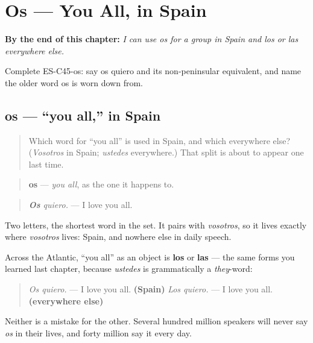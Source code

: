 
\chapter{Os --- You All, in Spain}
\label{ch:pronoun-os}

\begin{chapteropening}
\textbf{By the end of this chapter:} \emph{I can use os for a group in Spain and los or las everywhere else.}

Complete ES-C45-os: say os quiero and its non-peninsular equivalent, and name the older word os is worn down from.
\end{chapteropening}

\section[os]{os — \textquotedblleft{}you all,\textquotedblright{} in Spain}

\label{lesson:ES-C45-os}



\begin{quote}
Which word for \textquotedblleft{}you all\textquotedblright{} is used in Spain, and which everywhere else? (\emph{Vosotros} in Spain; \emph{ustedes} everywhere.) That split is about to appear one last time.
\end{quote}

\begin{grammarlens}[title={Grammar Lens: the object form of vosotros}]
\begin{quote}
\textbf{os} — \emph{you all}, as the one it happens to.
\end{quote}

\begin{quote}
\emph{\textbf{Os} quiero.} — I love you all.
\end{quote}

Two letters, the shortest word in the set. It pairs with \emph{vosotros}, so it lives exactly where \emph{vosotros} lives: Spain, and nowhere else in daily speech.

Across the Atlantic, \textquotedblleft{}you all\textquotedblright{} as an object is \textbf{los} or \textbf{las} — the same forms you learned last chapter, because \emph{ustedes} is grammatically a \emph{they}-word:

\begin{quote}
\emph{Os quiero.} — I love you all. \textbf{(Spain)} \emph{Los quiero.} — I love you all. \textbf{(everywhere else)}
\end{quote}

Neither is a mistake for the other. Several hundred million speakers will never say \emph{os} in their lives, and forty million say it every day.
\end{grammarlens}

